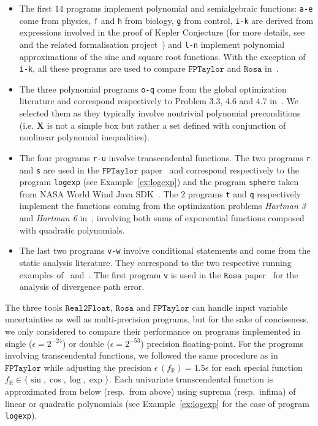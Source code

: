 \documentclass[preprint]{sigplanconf}
\newcommand{\code}[1]{\lstinline{#1}}
\newcommand{\R}{\mathbb{R}}
\def\X{\mathbf{X}}
\newcommand{\realtofloat}{\mathtt{Real2Float}}
\newcommand{\rosa}{\mathtt{Rosa}}
\newcommand{\fptaylor}{\mathtt{FPTaylor}}
\theoremstyle{plain}
\begin{document}
\begin{itemize}
\item The first $14$ programs implement polynomial and semialgebraic functions: \code{a-e} come from physics, \code{f} and \code{h} from biology, \code{g} from control, \code{i-k} are derived from expressions involved in the proof of Kepler Conjecture (for more details, see~\cite{halesalgo} and the related formalisation project~\cite{Flyspeck06}) and \code{l-n} implement polynomial approximations of the sine and square root functions. With the exception of \code{i-k}, all these programs are used to compare $\fptaylor$ and $\rosa$ in~\cite{fptaylor15}. 
\item The three polynomial programs \code{o-q} come from the global optimization literature and correspond respectively to Problem 3.3, 4.6 and 4.7 in~\cite{Floudas90}. We selected them as they typically involve nontrivial polynomial preconditions (i.e. $\X$ is not a simple box but rather a set defined with conjunction of nonlinear polynomial inequalities).
\item The four programs \code{r-u} involve transcendental functions. The two programs \code{r} and \code{s} are used in the $\fptaylor$ paper~\cite{fptaylor15} and correspond respectively to the program \code{logexp} (see Example~\ref{ex:logexp}) and the program \code{sphere} taken from NASA World Wind Java SDK~\cite{NASA}. The $2$ programs \code{t} and \code{q} respectively implement the functions coming from the optimization problems \textit{Hartman 3} and \textit{Hartman 6} in~\cite{Ali05}, involving both sums of exponential functions composed with quadratic polynomials.
\item The last two programs \code{v-w} involve conditional statements and come from the static analysis literature. They correspond to the two respective running examples of~\cite{Zonotope10} and~\cite{Marechal14}. The first program \code{v} is used in the $\rosa$ paper~\cite{Darulova14Popl} for the analysis of divergence path error.
\end{itemize}
%
The three tools $\realtofloat$, $\rosa$ and $\fptaylor$ can handle input variable uncertainties as well as multi-precision programs, but for the sake of conciseness, we only considered to compare their performance on programs implemented in single ($\epsilon = 2^{-24}$) or double ($\epsilon = 2^{-53}$) precision floating-point.
For the programs involving transcendental functions, we followed the same procedure as in $\fptaylor$ while adjusting the precision $\epsilon \,  (f_{\R}) = 1.5 \epsilon$ for each special function $f_{\R} \in \{\sin, \cos, \log, \exp \}$. Each univariate transcendental function is approximated from below (resp.~from above) using suprema (resp.~infima) of linear or quadratic polynomials (see Example~\ref{ex:logexp} for the case of program \code{logexp}). 
%
\end{document}
